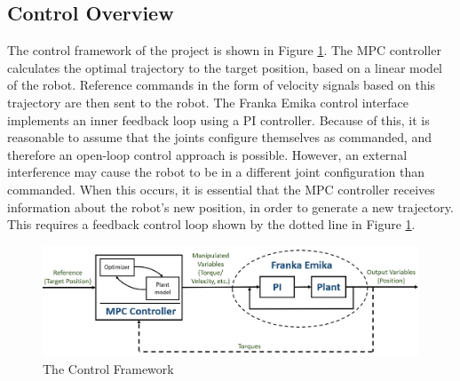 \documentclass[final]{LTHtwocol} %
\begin{document}
\subsection{Control Overview}
The control framework of the project is shown in Figure \ref{fig:framework}. The MPC controller calculates the optimal trajectory to the target position, based on a linear model of the robot. Reference commands in the form of velocity signals based on this trajectory are then sent to the robot. The Franka Emika control interface implements an inner feedback loop using a PI controller. Because of this, it is reasonable to assume that the joints configure themselves as commanded, and therefore an open-loop control approach is possible. However, an external interference may cause the robot to be in a different joint configuration than commanded. When this occurs, it is essential that the MPC controller receives information about the robot’s new position, in order to generate a new trajectory. This requires a feedback control loop shown by the dotted line in Figure \ref{fig:framework}.

\begin{figure}[b]
	\centering
	\includegraphics[width=1\columnwidth]{MPC4.png}
	\caption{The Control Framework}
	\label{fig:framework} 
\end{figure}
\end{document}

